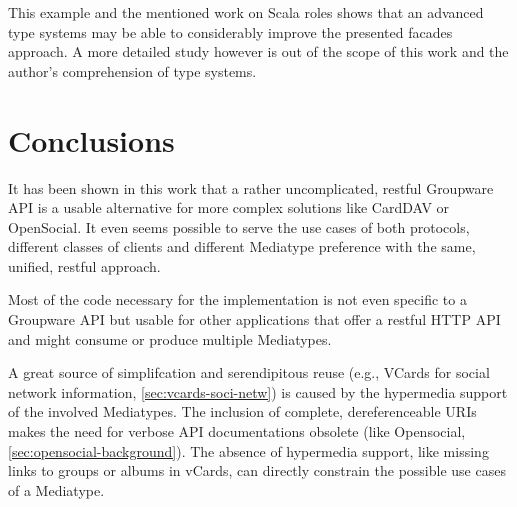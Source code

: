 \documentclass[11pt,a4paper,headsepline,twoside]{scrartcl}		%
\begin{document}
This example and the mentioned work on Scala roles shows that an advanced type
systems may be able to considerably improve the presented facades approach. A
more detailed study however is out of the scope of this work and the author's
comprehension of type systems.

\section{Conclusions}
\label{sec:conclusions}



It has been shown in this work that a rather uncomplicated, restful Groupware
API is a usable alternative for more complex solutions like CardDAV or
OpenSocial. It even seems possible to serve the use cases of both protocols,
different classes of clients and different Mediatype preference with the same,
unified, restful approach.

Most of the code necessary for the implementation is not even specific to a
Groupware API but usable for other applications that offer a restful HTTP API
and might consume or produce multiple Mediatypes.

A great source of simplifcation and serendipitous reuse (e.g., VCards for social
network information, \autoref{sec:vcards-soci-netw}) is caused by the hypermedia
support of the involved Mediatypes.  The inclusion of complete, dereferenceable
URIs makes the need for verbose API documentations obsolete (like Opensocial,
\autoref{sec:opensocial-background}). The absence of hypermedia support, like
missing links to groups or albums in vCards, can directly constrain the possible
use cases of a Mediatype.
\end{document}
